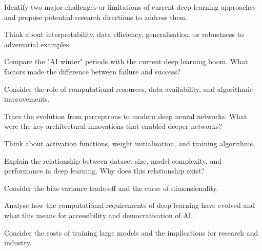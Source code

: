 \begin{exercisebox}[medium]
\begin{problem}
Identify two major challenges or limitations of current deep learning approaches and propose potential research directions to address them.
\end{problem}
\begin{hintbox}
Think about interpretability, data efficiency, generalisation, or robustness to adversarial examples.
\end{hintbox}
\end{exercisebox}


\begin{exercisebox}[medium]
\begin{problem}
Compare the "AI winter" periods with the current deep learning boom. What factors made the difference between failure and success?
\end{problem}
\begin{hintbox}
Consider the role of computational resources, data availability, and algorithmic improvements.
\end{hintbox}
\end{exercisebox}


\begin{exercisebox}[medium]
\begin{problem}
Trace the evolution from perceptrons to modern deep neural networks. What were the key architectural innovations that enabled deeper networks?
\end{problem}
\begin{hintbox}
Think about activation functions, weight initialisation, and training algorithms.
\end{hintbox}
\end{exercisebox}


\begin{exercisebox}[medium]
\begin{problem}
Explain the relationship between dataset size, model complexity, and performance in deep learning. Why does this relationship exist?
\end{problem}
\begin{hintbox}
Consider the bias-variance trade-off and the curse of dimensionality.
\end{hintbox}
\end{exercisebox}


\begin{exercisebox}[medium]
\begin{problem}
Analyse how the computational requirements of deep learning have evolved and what this means for accessibility and democratisation of AI.
\end{problem}
\begin{hintbox}
Consider the costs of training large models and the implications for research and industry.
\end{hintbox}
\end{exercisebox}


